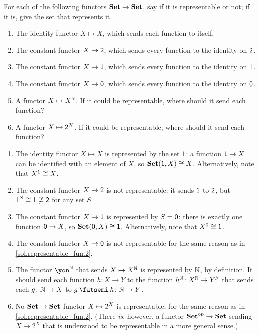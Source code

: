 \documentclass[Book-Poly]{subfiles}
\begin{document}
\begin{exercise}\label{exc.representable_fun}
    For each of the following functors $\mathbf{Set}\to\mathbf{Set}$, say if it is representable or not; if it is, give the set that represents it.
    \begin{enumerate}
        \item The identity functor $X\mapsto X$, which sends each function to itself.
        \item The constant functor $X\mapsto\textsf{2}$, which sends every function to the identity on $\textsf{2}$.
        \item The constant functor $X\mapsto\textsf{1}$, which sends every function to the identity on $\textsf{1}$.
        \item The constant functor $X\mapsto\textsf{0}$, which sends every function to the identity on $\textsf{0}$.
        \item A functor $X\mapsto X^{\mathbb{N}}$.
        If it could be representable, where should it send each function?
        \item A functor $X\mapsto \textsf{2}^X$.
        If it could be representable, where should it send each function? \qedhere
    \end{enumerate}

    \begin{solution}
        \begin{enumerate}
            \item The identity functor $X\mapsto X$ is represented by the set $\textsf{1}$: a function $\textsf{1} \to X$ can be identified with an element of $X$, so $\mathbf{Set}(\textsf{1},X)\cong X$.
            Alternatively, note that $X^{\textsf{1}} \cong X$.
            \item \label{sol.representable_fun.2} The constant functor $X\mapsto\textsf{2}$ is not representable: it sends $\textsf{1}$ to $\textsf{2}$, but $\textsf{1}^S \cong \textsf{1} \not\cong \textsf{2}$ for any set $S$.
            \item The constant functor $X\mapsto\textsf{1}$ is represented by $S=\textsf{0}$: there is exactly one function $\textsf{0} \to X$, so $\mathbf{Set}(\textsf{0},X) \cong \textsf{1}$.
            Alternatively, note that $X^0 \cong \textsf{1}$.
            \item The constant functor $X\mapsto\textsf{0}$ is not representable for the same reason as in \cref{sol.representable_fun.2}.
            \item The functor $\yon^\nn$ that sends $X\mapsto X^{\mathbb{N}}$ is represented by $\mathbb{N}$, by definition.
            It should send each function $h \colon X \to Y$ to the function $h^{\mathbb{N}} \colon X^{\mathbb{N}} \to Y^{\mathbb{N}}$ that sends each $g \colon \mathbb{N} \to X$ to $g \then h \colon \nn \to Y$.
            \item No $\mathbf{Set} \to \mathbf{Set}$ functor $X\mapsto \textsf{2}^X$ is representable, for the same reason as in \cref{sol.representable_fun.2}.
            (There \emph{is}, however, a functor $\mathbf{Set}^{\textnormal{op}} \to \mathbf{Set}$ sending $X \mapsto 2^X$ that is understood to be representable in a more general sense.)
        \end{enumerate}
    \end{solution}
\end{exercise}
\end{document}
